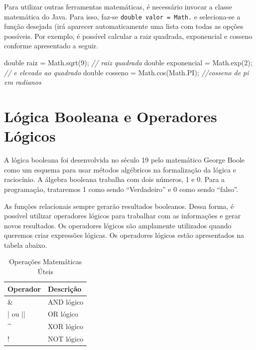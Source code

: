 \documentclass[
]{book}
\newenvironment{Shaded}{\begin{snugshade}}{\end{snugshade}}
\newcommand{\BuiltInTok}[1]{#1}
\newcommand{\CommentTok}[1]{\textcolor[rgb]{0.56,0.35,0.01}{\textit{#1}}}
\newcommand{\DataTypeTok}[1]{\textcolor[rgb]{0.13,0.29,0.53}{#1}}
\newcommand{\DecValTok}[1]{\textcolor[rgb]{0.00,0.00,0.81}{#1}}
\newcommand{\FunctionTok}[1]{\textcolor[rgb]{0.00,0.00,0.00}{#1}}
\newcommand{\NormalTok}[1]{#1}
\begin{document}
Para utilizar outras ferramentas matemáticas, é necessário invocar a classe matemática do Java. Para isso, faz-se \texttt{double\ valor\ =\ Math.} e seleciona-se a função desejada (irá aparecer automaticamente uma lista com todas as opções possíveis. Por exemplo, é possível calcular a raiz quadrada, exponencial e cosseno conforme apresentado a seguir.

\begin{Shaded}
\begin{Highlighting}[]
\DataTypeTok{double}\NormalTok{ raiz = }\BuiltInTok{Math}\NormalTok{.}\FunctionTok{sqrt}\NormalTok{(}\DecValTok{9}\NormalTok{); }\CommentTok{// raiz quadrada}
\DataTypeTok{double}\NormalTok{ exponencial = }\BuiltInTok{Math}\NormalTok{.}\FunctionTok{exp}\NormalTok{(}\DecValTok{2}\NormalTok{); }\CommentTok{// e elevado ao quadrado}
\DataTypeTok{double}\NormalTok{ cosseno  = }\BuiltInTok{Math}\NormalTok{.}\FunctionTok{cos}\NormalTok{(}\BuiltInTok{Math}\NormalTok{.}\FunctionTok{PI}\NormalTok{); }\CommentTok{//cosseno de pi em radianos}
\end{Highlighting}
\end{Shaded}

\hypertarget{luxf3gica-booleana-e-operadores-luxf3gicos}{%
\section{Lógica Booleana e Operadores Lógicos}\label{luxf3gica-booleana-e-operadores-luxf3gicos}}

A lógica booleana foi desenvolvida no século 19 pelo matemático George Boole como um esquema para usar métodos algébricos na formalização da lógica e raciocínio. A álgebra booleana trabalha com dois números, 1 e 0. Para a programação, trataremos 1 como sendo ``Verdadeiro'' e 0 como sendo ``falso''.

As funções relacionais sempre gerarão resultados booleanos. Dessa forma, é possível utilizar operadores lógicos para trabalhar com as informações e gerar novos resultados. Os operadores lógicos são amplamente utilizados quando queremos criar expressões lógicas. Os operadores lógicos estão apresentados na tabela abaixo.

\begin{table}

\caption{\label{tab:unnamed-chunk-8}Operações Matemáticas Úteis}
\centering
\begin{tabular}[t]{l|l}
\hline
Operador & Descrição\\
\hline
\& & AND lógico\\
\hline
| ou || & OR lógico\\
\hline
\textasciicircum{} & XOR lógico\\
\hline
! & NOT lógico\\
\hline
\end{tabular}
\end{table}
\end{document}
